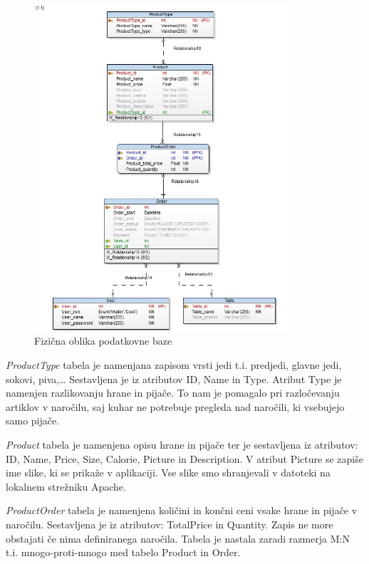 \documentclass[a4paper, 12pt]{book}
\begin{document}
\begin{figure}[!htb]
\begin{center}
\includegraphics[width=0.85\textwidth]{Database_physical}
\end{center}
\caption{Fizična oblika podatkovne baze}
\label{Database_physical}
\end{figure}

\textit{ProductType} tabela je namenjana zapisom vrsti jedi t.i. predjedi, glavne jedi, sokovi, piva,… Sestavljena je iz atributov ID, Name in Type. Atribut Type je namenjen razlikovanju hrane in pijače. To nam je pomagalo pri razločevanju artiklov v naročilu, saj kuhar ne potrebuje pregleda nad naročili, ki vsebujejo samo pijače. 

\textit{Product} tabela je namenjena opisu hrane in pijače ter je sestavljena iz atributov: ID, Name, Price, Size, Calorie, Picture in Description.  V atribut Picture se zapiše ime slike, ki se prikaže v aplikaciji. Vse slike smo shranjevali v datoteki na lokalnem strežniku Apache.

\textit{ProductOrder} tabela je namenjena količini in končni ceni vsake hrane in pijače v naročilu. Sestavljena je iz atributov: TotalPrice in Quantity. Zapis ne more obstajati če nima definiranega naročila. Tabela je nastala zaradi razmerja M:N t.i. mnogo-proti-mnogo med tabelo Product in Order.
\end{document}

